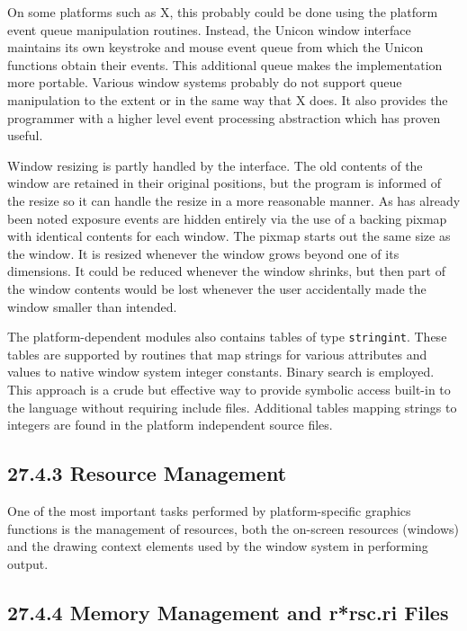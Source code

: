 On some platforms such as X, this probably could be done using the
platform event queue manipulation routines.  Instead, the Unicon
window interface maintains its own keystroke and mouse event queue
from which the Unicon functions obtain their events. This additional
queue makes the implementation more portable. Various window systems
probably do not support queue manipulation to the extent or in the
same way that X does. It also provides the programmer with a higher
level event processing abstraction which has proven useful.

Window resizing is partly handled by the interface. The old contents
of the window are retained in their original positions, but the
program is informed of the resize so it can handle the resize in a
more reasonable manner. As has already been noted exposure events are
hidden entirely via the use of a backing pixmap with identical
contents for each window. The pixmap starts out the same size as the
window. It is resized whenever the window grows beyond one of its
dimensions. It could be reduced whenever the window shrinks, but then
part of the window contents would be lost whenever the user
accidentally made the window smaller than intended.

The platform-dependent modules also contains tables of type
\texttt{stringint}. These tables are supported by routines that map
strings for various attributes and values to native window system
integer constants. Binary search is employed. This approach is a crude
but effective way to provide symbolic access
{\textquotedbl}built-in{\textquotedbl} to the language without
requiring include files. Additional tables mapping strings to
integers are found in the platform independent source files.

\subsection[27.4.3 Resource Management]{27.4.3 Resource Management}

One of the most important tasks performed by platform-specific
graphics functions is the management of resources, both the on-screen
resources (windows) and the drawing context elements used by the
window system in performing output.

\subsection[27.4.4 Memory Management and r*rsc.ri Files]{27.4.4 Memory Management and r*rsc.ri Files}


